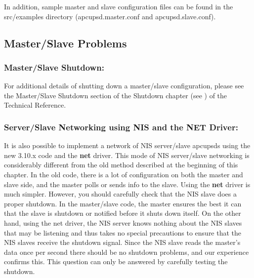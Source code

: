 {{{{{{{{In addition, sample master and slave configuration files can be found in the
\lt{}src\gt{}/examples directory (apcupsd.master.conf and apcupsd.slave.conf).


\label{Master_002fSlave-Problems}

\subsection*{Master/Slave Problems}

\label{index-Master_002fSlave-155}
\label{index-Problems_002c-Master_002fslave-156}

\label{Master_002fSlave-Shutdown}

\subsubsection*{Master/Slave Shutdown:}

For additional details of shutting down a master/slave configuration, please
see the Master/Slave Shutdown section of the Shutdown chapter (see 
) of the Technical
Reference. 

\label{Server_002fSlave-Networking-using-NIS-and-the-NET-Driver}

\subsubsection*{Server/Slave Networking using NIS and the NET Driver:}

\label{index-NIS-networking-157}
\label{index-Net-driver-158}
It is also possible to implement a network of NIS server/slave apcupsds using
the new 3.10.x code and the {\bf net} driver. This mode of NIS server/slave
networking is considerably different from the old method described at the
beginning of this chapter. In the old code, there is a lot of configuration on
both the master and slave side, and the master polls or sends info to the
slave. Using the {\bf net} driver is much simpler. However, you should
carefully check that the NIS slave does a proper shutdown. In the master/slave
code, the master ensures the best it can that the slave is shutdown or
notified before it shuts down itself. On the other hand, using the net driver,
the NIS server knows nothing about the NIS slaves that may be listening and
thus takes no special precautions to ensure that the NIS slaves receive the
shutdown signal. Since the NIS slave reads the master's data once per second
there should be no shutdown problems, and our experience confirms this.  This
question can only be answered by carefully testing the shutdown.  

}}}}}}}}
